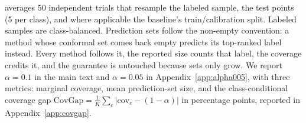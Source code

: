 averages 50 independent trials that resample the labeled sample, the
test points (5 per class), and where applicable the baseline's
train/calibration split. Labeled samples are class-balanced.
Prediction sets follow the non-empty convention: a method whose
conformal set comes back empty predicts its top-ranked label instead.
Every method follows it, the reported size counts that label, the
coverage credits it, and the guarantee is untouched because sets only
grow.
We report $\alpha = 0.1$ in the main text and $\alpha = 0.05$ in
Appendix~\ref{app:alpha005}, with three metrics: marginal coverage,
mean prediction-set
size, and
the class-conditional
coverage gap
$\mathrm{CovGap} = \frac{1}{K}\sum_c |\mathrm{cov}_c - (1-\alpha)|$ in
percentage points, reported in Appendix~\ref{app:covgap}.
